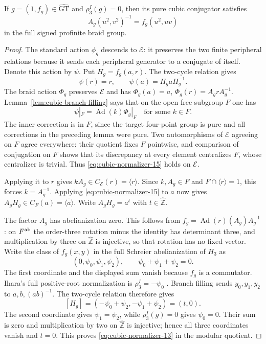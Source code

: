 \begin{proposition}\label{prop:normalized-HF1-from-normalizer}
If $g=(1,f_g)\in\widehat{\mathrm{GT}}$ and
$\rho_3^I(g)=0$, then its pure cubic conjugator satisfies
\begin{equation}\label{eq:cubic-normalizer-13}
\boxed{\quad A_g(u^2,v^2)^{-1}=f_g(u^2,uv)\quad}
\end{equation}
in the full signed profinite braid group.
\end{proposition}
\begin{proof}
The standard action $\phi_g$ descends to $\mathcal E$: it preserves
the two finite peripheral relations because it sends each
peripheral generator to a conjugate of itself. Denote this
action by $\psi$. Put $H_g=f_g(a,r)$. The two-cycle relation
gives
\begin{equation}\label{eq:cubic-normalizer-14}
\psi(r)=r,\qquad\psi(a)=H_g aH_g^{-1}.
\end{equation}
The braid action $\Phi_g$ preserves $\mathcal E$ and has
$\Phi_g(a)=a$, $\Phi_g(r)=A_g rA_g^{-1}$.
Lemma~\ref{lem:cubic-branch-filling} says that on the open
free subgroup $F$ one has
\begin{equation}\label{eq:cubic-normalizer-15}
\psi|_F=\operatorname{Ad}(k)\Phi_g|_F
                  \quad\text{for some }k\in F.
\end{equation}
The inner correction is in $F$, since the target four-point
group is pure and all corrections in the preceding lemma
were pure. Two automorphisms of $\mathcal E$ agreeing on $F$ agree
everywhere: their quotient fixes $F$ pointwise, and comparison
of conjugation on $F$ shows that its discrepancy at every
element centralizes $F$, whose centralizer is trivial.
Thus \eqref{eq:cubic-normalizer-15} holds on $\mathcal E$.

Applying it to $r$ gives $kA_g\in C_\mathcal E(r)=\langle r\rangle$.
Since $k,A_g\in F$ and $F\cap\langle r\rangle=1$, this
forces $k=A_g^{-1}$. Applying \eqref{eq:cubic-normalizer-15} to $a$ now gives
$A_gH_g\in C_F(a)=\overline{\langle a\rangle}$.
Write $A_gH_g=a^t$ with $t\in\widehat{\mathbb Z}$.

The factor $A_g$ has abelianization zero. This follows from
$f_g=\operatorname{Ad}(r)(A_g)A_g^{-1}$: on $F^{\rm ab}$
the order-three rotation minus the identity has determinant
three, and multiplication by three on $\widehat{\mathbb Z}$
is injective, so that rotation has no fixed vector.
Write the class of $f_g(x,y)$ in the full Schreier
abelianization of $H_3$ as
\[
 (0,\psi_0,\psi_1,\psi_2),\qquad
 \psi_0+\psi_1+\psi_2=0.
\]
The first coordinate and the displayed sum vanish because
$f_g$ is a commutator. Ihara's full positive-root normalization
is $\rho_3^I=-\psi_0$
\cite[Section~5, p.~205]{NT2002}.
Branch filling sends $y_0,y_1,y_2$ to $a,b,(ab)^{-1}$.
The two-cycle relation therefore gives
\[
 [H_g]=(-\psi_0+\psi_2,-\psi_1+\psi_2)=(t,0).
\]
The second coordinate gives $\psi_1=\psi_2$, while
$\rho_3^I(g)=0$ gives $\psi_0=0$. Their sum is zero and
multiplication by two on $\widehat{\mathbb Z}$ is injective;
hence all three coordinates vanish and $t=0$.
This proves \eqref{eq:cubic-normalizer-13} in
the modular quotient.


\end{proof}
